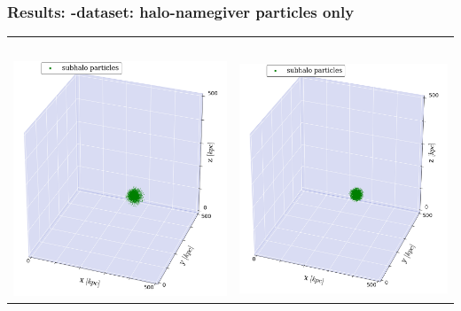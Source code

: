 \begin{frame}
	\frametitle{Results: \dt-dataset: halo-namegiver particles only}
	
	\begin{tabular}{c c}
		\neigh\ 	& \iter \\[1.5em]
		{\includegraphics[width = .49\textwidth]{../report/images/dice-two/dice-two-plot-subhalo-saddle.png}}	&
		{\includegraphics[width = .49\textwidth]{../report/images/dice-two/dice-two-plot-subhalo-iter.png}}  
	\end{tabular}
\end{frame}




%	
%		
%
%
%
%	



